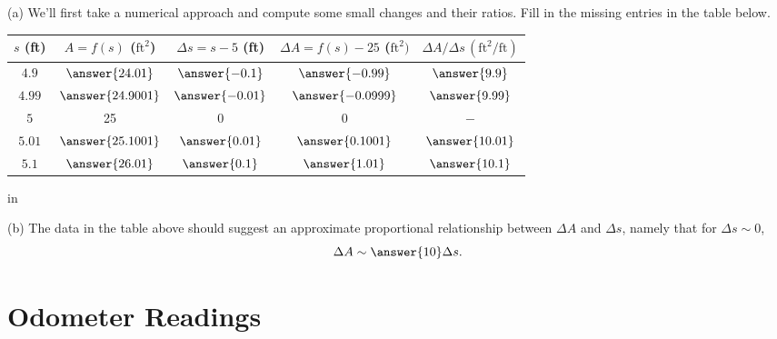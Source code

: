 \documentclass{ximera}
\newcommand{\pskip}{\vskip 0.1 in}
\begin{document}
\begin{question}  \label{Qfrdsft4t4tt}
(a) We'll first take a numerical approach and compute some small changes and their ratios. Fill in the missing entries in the table below.

\begin{center}
  \begin{tabular}{ | c| c | c | c | c |}
    \hline
    $s$ (ft) & $A = f(s)$ ($\text{ft}^2$) & $\Delta s = s-5$ (ft)  & $\Delta A = f(s) - 25$ ($\text{ft}^2)$ & $\Delta A/\Delta s \, (\text{ft}^2/\text{ft})$ \\ \hline
    $4.9$ & $\answer{24.01}$ & $\answer{-0.1}$ &  $\answer{-0.99}$ & $\answer{9.9}$ \\ \hline
    $4.99$ & $\answer{24.9001}$ & $\answer{-0.01}$ &  $\answer{-0.0999}$ & $\answer{9.99}$ \\ \hline
    $5$  &  25 & $0$ & $0$ & $-$  \\ \hline
    $5.01$ & $\answer{25.1001}$ & $\answer{0.01}$ &  $\answer{0.1001}$ & $\answer{10.01}$ \\ \hline
    $5.1$ & $\answer{26.01}$ & $\answer{0.1}$ &  $\answer{1.01}$ & $\answer{10.1}$ \\ \hline
    \hline
  \end{tabular}
\end{center}

\pskip

(b) The data in the table above should suggest an approximate proportional relationship between $\Delta A$ and $\Delta s$, namely that for $\Delta s \sim 0$, 
\[
   \Delta A \sim \answer{10} \Delta s .
\]


\end{question}

\section{Odometer Readings}
\end{document}
